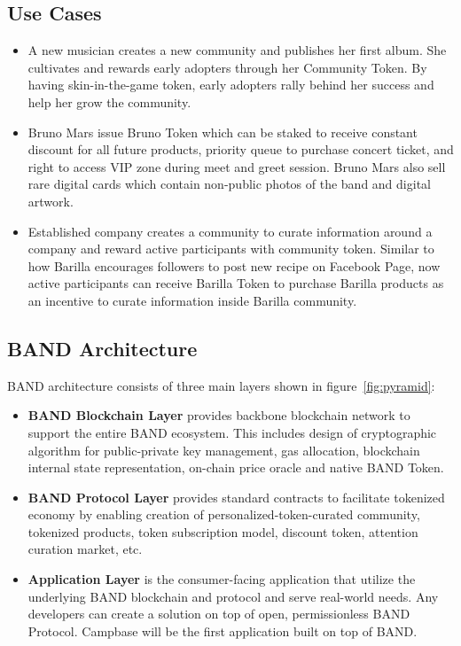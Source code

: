 \documentclass[letterpaper,11pt]{article}
\begin{document}
\subsection{Use Cases}
\begin{itemize}
\item A new musician creates a new community and publishes her first album. She cultivates and rewards early adopters through her Community Token. By having skin-in-the-game token, early adopters rally behind her success and help her grow the community.
\item Bruno Mars issue Bruno Token which can be staked to receive constant discount for all future products, priority queue to purchase concert ticket, and right to access VIP zone during meet and greet session. Bruno Mars also sell rare digital cards which contain non-public photos of the band and digital artwork.
\item Established company creates a community to curate information around a company and reward active participants with community token. Similar to how Barilla encourages followers to post new recipe on Facebook Page, now active participants can receive Barilla Token to purchase Barilla products as an incentive to curate information inside Barilla community.
\end{itemize}

\subsection{BAND Architecture} \label{sec:band-architecture}

BAND architecture consists of three main layers shown in figure~\ref{fig:pyramid}:

\begin{itemize}
\item \textbf{BAND Blockchain Layer} provides backbone blockchain network to support the entire BAND ecosystem. This includes design of cryptographic algorithm for public-private key management, gas allocation, blockchain internal state representation, on-chain price oracle and native BAND Token.
\item \textbf{BAND Protocol Layer} provides standard contracts to facilitate tokenized economy by enabling creation of personalized-token-curated community, tokenized products, token subscription model, discount token, attention curation market, etc.
\item \textbf{Application Layer} is the consumer-facing application that utilize the underlying BAND blockchain and protocol and serve real-world needs. Any developers can create a solution on top of open, permissionless BAND Protocol. Campbase will be the first application built on top of BAND.
\end{itemize}
\end{document}

